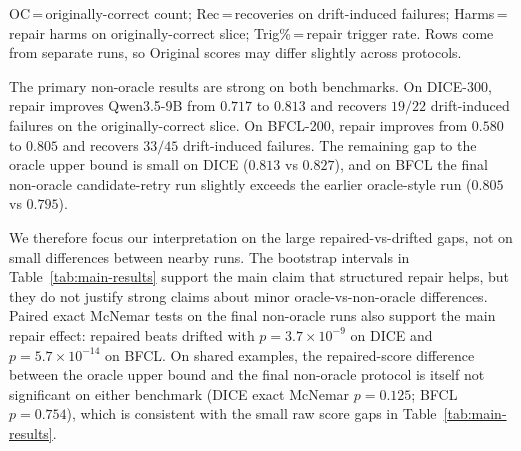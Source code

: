 \documentclass[runningheads]{llncs}
\begin{document}
\begin{table}[t]
\caption{Primary non-oracle Qwen3.5-9B results on DICE-300 and BFCL-200, with
oracle upper bounds. Brackets give 95\% bootstrap CIs (seed~42).}
\label{tab:main-results}
\centering
\scriptsize
\setlength{\tabcolsep}{3.5pt}
\par\smallskip\raggedright\scriptsize
OC\,=\,originally-correct count; Rec\,=\,recoveries on drift-induced failures;
Harms\,=\,repair harms on originally-correct slice; Trig\%\,=\,repair trigger rate.
Rows come from separate runs, so Original scores may differ slightly across protocols.
\end{table}

The primary non-oracle results are strong on both benchmarks. On DICE-300, repair
improves Qwen3.5-9B from $0.717$ to $0.813$ and recovers $19/22$ drift-induced
failures on the originally-correct slice. On BFCL-200, repair improves from $0.580$
to $0.805$ and recovers $33/45$ drift-induced failures. The remaining gap to the
oracle upper bound is small on DICE ($0.813$ vs $0.827$), and on BFCL the final
non-oracle candidate-retry run slightly exceeds the earlier oracle-style run
($0.805$ vs $0.795$).

We therefore focus our interpretation on the large repaired-vs-drifted gaps, not on
small differences between nearby runs. The bootstrap intervals in
Table~\ref{tab:main-results} support the main claim that structured repair helps,
but they do not justify strong claims about minor oracle-vs-non-oracle differences.
Paired exact McNemar tests on the final non-oracle runs also support the main
repair effect: repaired beats drifted with $p=3.7\times 10^{-9}$ on DICE and
$p=5.7\times 10^{-14}$ on BFCL. On shared examples, the repaired-score difference
between the oracle upper bound and the final non-oracle protocol is itself not
significant on either benchmark (DICE exact McNemar $p=0.125$; BFCL
$p=0.754$), which is consistent with the small raw score gaps in
Table~\ref{tab:main-results}.
\end{document}
